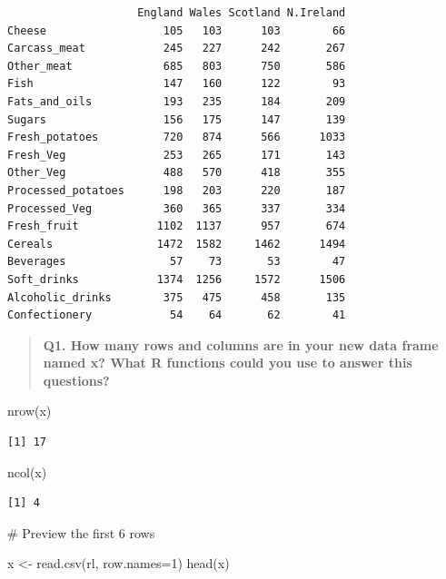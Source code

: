 \documentclass[
  letterpaper,
  DIV=11,
  numbers=noendperiod]{scrartcl}
\newenvironment{Shaded}{\begin{snugshade}}{\end{snugshade}}
\newcommand{\AttributeTok}[1]{\textcolor[rgb]{0.40,0.45,0.13}{#1}}
\newcommand{\DecValTok}[1]{\textcolor[rgb]{0.68,0.00,0.00}{#1}}
\newcommand{\FunctionTok}[1]{\textcolor[rgb]{0.28,0.35,0.67}{#1}}
\newcommand{\NormalTok}[1]{\textcolor[rgb]{0.00,0.23,0.31}{#1}}
\newcommand{\OtherTok}[1]{\textcolor[rgb]{0.00,0.23,0.31}{#1}}
\begin{document}
\begin{verbatim}
                    England Wales Scotland N.Ireland
Cheese                  105   103      103        66
Carcass_meat            245   227      242       267
Other_meat              685   803      750       586
Fish                    147   160      122        93
Fats_and_oils           193   235      184       209
Sugars                  156   175      147       139
Fresh_potatoes          720   874      566      1033
Fresh_Veg               253   265      171       143
Other_Veg               488   570      418       355
Processed_potatoes      198   203      220       187
Processed_Veg           360   365      337       334
Fresh_fruit            1102  1137      957       674
Cereals                1472  1582     1462      1494
Beverages                57    73       53        47
Soft_drinks            1374  1256     1572      1506
Alcoholic_drinks        375   475      458       135
Confectionery            54    64       62        41
\end{verbatim}

\begin{quote}
\textbf{Q1. How many rows and columns are in your new data frame named
x? What R functions could you use to answer this questions?}
\end{quote}

\begin{Shaded}
\begin{Highlighting}[]
\FunctionTok{nrow}\NormalTok{(x)}
\end{Highlighting}
\end{Shaded}

\begin{verbatim}
[1] 17
\end{verbatim}

\begin{Shaded}
\begin{Highlighting}[]
\FunctionTok{ncol}\NormalTok{(x)}
\end{Highlighting}
\end{Shaded}

\begin{verbatim}
[1] 4
\end{verbatim}

\# Preview the first 6 rows

\begin{Shaded}
\begin{Highlighting}[]
\NormalTok{x }\OtherTok{\textless{}{-}} \FunctionTok{read.csv}\NormalTok{(rl, }\AttributeTok{row.names=}\DecValTok{1}\NormalTok{)}
\FunctionTok{head}\NormalTok{(x)}
\end{Highlighting}
\end{Shaded}
\end{document}
